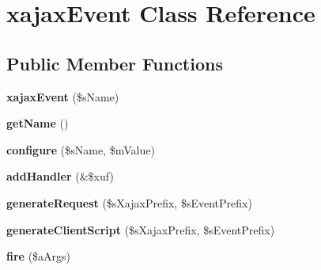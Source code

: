 \hypertarget{classxajaxEvent}{
\section{xajaxEvent Class Reference}
\label{classxajaxEvent}
}
\subsection*{Public Member Functions}
\begin{DoxyCompactItemize}
\item 
\hypertarget{classxajaxEvent_aeae6b8e12db5b94c1b792d2490a6f41d}{
{\bfseries xajaxEvent} (\$sName)}
\label{classxajaxEvent_aeae6b8e12db5b94c1b792d2490a6f41d}

\item 
\hypertarget{classxajaxEvent_a2da3c539ec6bff752dce4d3c317b3a6a}{
{\bfseries getName} ()}
\label{classxajaxEvent_a2da3c539ec6bff752dce4d3c317b3a6a}

\item 
\hypertarget{classxajaxEvent_a1b60e2e7f07d2d4fc7ef20e5f26f073c}{
{\bfseries configure} (\$sName, \$mValue)}
\label{classxajaxEvent_a1b60e2e7f07d2d4fc7ef20e5f26f073c}

\item 
\hypertarget{classxajaxEvent_a4fdbcc5cbb4d24764402504c88162561}{
{\bfseries addHandler} (\&\$xuf)}
\label{classxajaxEvent_a4fdbcc5cbb4d24764402504c88162561}

\item 
\hypertarget{classxajaxEvent_a81e1ae6da9b46f110ba9ffb5396ab438}{
{\bfseries generateRequest} (\$sXajaxPrefix, \$sEventPrefix)}
\label{classxajaxEvent_a81e1ae6da9b46f110ba9ffb5396ab438}

\item 
\hypertarget{classxajaxEvent_a7105efa8fb0efc81366eaea90d89dedb}{
{\bfseries generateClientScript} (\$sXajaxPrefix, \$sEventPrefix)}
\label{classxajaxEvent_a7105efa8fb0efc81366eaea90d89dedb}

\item 
\hypertarget{classxajaxEvent_afd8a290078360a3c5155ca0e4aa7be33}{
{\bfseries fire} (\$aArgs)}
\label{classxajaxEvent_afd8a290078360a3c5155ca0e4aa7be33}

\end{DoxyCompactItemize}
